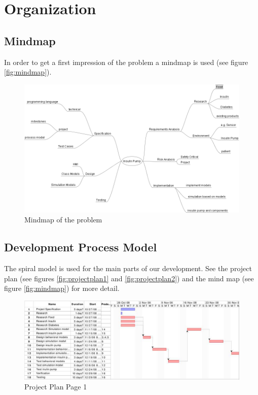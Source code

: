 \section{Organization}

\subsection{Mindmap}
In order to get a first impression of the problem a mindmap is used (see
figure \vref{fig:mindmap}).

\begin{figure}[htb]
\centering
\includegraphics[width=\textwidth]{images/Insulin_Pump_Mindmap.png}
\caption{Mindmap of the problem}
\label{fig:mindmap}
\end{figure}

\newpage
\subsection{Development Process Model}
The spiral model is used for the main parts of our development.
See the project plan (see figures \vref{fig:projectplan1} and \vref{fig:projectplan2}) and the
mind map (see figure \vref{fig:mindmap}) for more detail.

\begin{figure}[htb]
\centering
\includegraphics[width=\textwidth]{images/projectplan_page1}
\caption{Project Plan Page 1}
\label{fig:projectplan1}
\end{figure}

